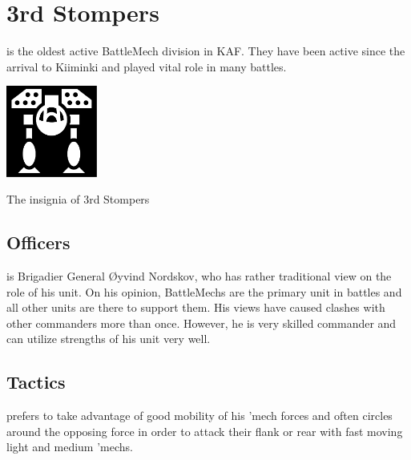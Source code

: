 \documentclass{tufte-book}
\begin{document}
\section{3rd Stompers}

 is the oldest active BattleMech division in KAF.
They have been active since the arrival to Kiiminki and played vital role in
many battles.

\begin{marginfigure}[0\baselineskip]
  \includegraphics[width=3cm]{missile-mech}
  \caption{The insignia of 3rd Stompers}
  \label{fig:stompers}
\end{marginfigure}

\subsection{Officers}

 is Brigadier General \O yvind
Nordskov, who has rather traditional view on the role of his unit. On his
opinion, BattleMechs are the primary unit in battles and all other units are
there to support them. His views have caused clashes with other commanders
more than once. However, he is very skilled commander and can utilize
strengths of his unit very well.

\subsection{Tactics}

 prefers to take advantage of good
mobility of his 'mech forces and often circles around the opposing force in
order to attack their flank or rear with fast moving light and medium 'mechs.

\bigskip
{}
\end{document}
